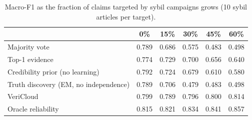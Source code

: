 \begin{table}[t]
\centering
\caption{Macro-F1 as the fraction of claims targeted by sybil campaigns grows (10 sybil articles per target).}
\label{tab:attack_breadth}
\small
\begin{tabular}{lccccc}
\toprule
 & 0\% & 15\% & 30\% & 45\% & 60\% \\
\midrule
Majority vote & 0.789 & 0.686 & 0.575 & 0.483 & 0.498 \\
Top-1 evidence & 0.774 & 0.729 & 0.700 & 0.656 & 0.640 \\
Credibility prior (no learning) & 0.792 & 0.724 & 0.679 & 0.610 & 0.580 \\
Truth discovery (EM, no independence) & 0.789 & 0.706 & 0.479 & 0.483 & 0.498 \\
VeriCloud & 0.799 & 0.789 & 0.796 & 0.800 & 0.814 \\
Oracle reliability & 0.815 & 0.821 & 0.834 & 0.841 & 0.857 \\
\bottomrule
\end{tabular}
\end{table}
